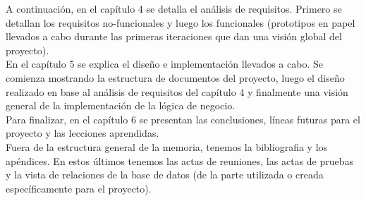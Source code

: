 A continuación, en el capítulo 4 se detalla el análisis de requisitos. Primero se detallan los requisitos no-funcionales y luego los funcionales (prototipos en papel llevados a cabo durante las primeras iteraciones que dan una visión global del proyecto).\\

En el capítulo 5 se explica el diseño e implementación llevados a cabo. Se comienza mostrando la estructura de documentos del proyecto, luego el diseño realizado en base al análisis de requisitos del capítulo 4 y finalmente una visión general de la implementación de la lógica de negocio.\\

Para finalizar, en el capítulo 6 se presentan las conclusiones, líneas futuras para el proyecto y las lecciones aprendidas.\\

Fuera de la estructura general de la memoria, tenemos la bibliografia y los apéndices. En estos últimos tenemos las actas de reuniones, las actas de pruebas y la vista de relaciones de la base de datos (de la parte utilizada o creada específicamente para el proyecto).\\
